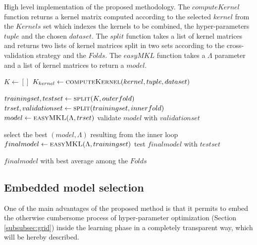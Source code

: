 \begin{algorithm}
    \caption{
        High level implementation of the proposed methodology.
        The $computeKernel$ function returns a kernel matrix computed
        according to the selected $kernel$ from the $Kernels$ set which indexes
        the kernels to be combined, the hyper-parameters $tuple$ and the chosen
        $dataset$.
        The $split$ function takes a list of kernel matrices and returns two lists
        of kernel matrices split in two sets according to the cross-validation
        strategy and the $Folds$.
        The $easyMKL$ function takes a $\Lambda$ parameter and a list of kernel
        matrices to return a $model$.
    }
    \label{alg:method}
    \begin{algorithmic}[1]
        \State $K \gets []$
        \label{line:kernels}
                \State $K_{kernel} \gets \Call{computeKernel}{kernel, tuple, dataset}$
            \EndFor
        \EndFor

            \State $trainingset, testset \gets \Call{split}{K, outerfold}$
            \label{line:osubsets}
                    \State $trset, validationset \gets \Call{split}{trainingset, innerfold}$
                    \label{line:isubsets}
                    \State $model \gets \Call{easyMKL}{\Lambda,trset}$
                    \State validate $model$ with $validationset$
                \EndFor
            \EndFor
            
            \State select the best $(model,\Lambda)$ resulting from the inner loop
            \State $finalmodel \gets \Call{easyMKL}{\Lambda,trainingset}$
            \State test $finalmodel$ with $testset$
        \EndFor

        \State \Return $finalmodel$ with best average among the $Folds$
    \end{algorithmic}
\end{algorithm}


\subsection{Embedded model selection}
\label{subsec:parameters}
One of the main advantages of the proposed method is that it permits to embed
the otherwise cumbersome process of hyper-parameter optimization (Section \ref{subsubsec:grid})
inside the learning phase in a completely transparent way, which will be hereby
described.

